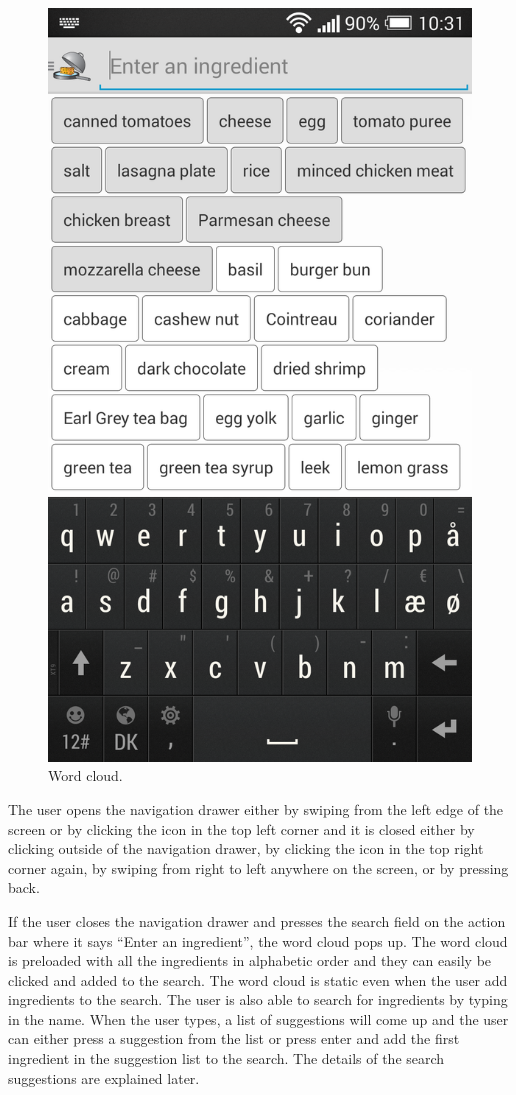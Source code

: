 \begin{figure}[H]
\begin{minipage}[t]{0.5\columnwidth}
\includegraphics[width=0.7\columnwidth]{img/screenshots/finalwordcloud.png}
\caption{Word cloud\label{fig:wordcloud}.}
\end{minipage}
\end{figure}

The user opens the navigation drawer either by swiping from the left edge of the screen or by clicking the icon in the top left corner and it is closed either by clicking outside of the navigation drawer, by clicking the icon in the top right corner again, by swiping from right to left anywhere on the screen, or by pressing back.

If the user closes the navigation drawer and presses the search field on the action bar where it says ``Enter an ingredient'', the word cloud pops up. The word cloud is preloaded with all the ingredients in alphabetic order and they can easily be clicked and added to the search. 
The word cloud is static even when the user add ingredients to the search. 
The user is also able to search for ingredients by typing in the name. 
When the user types, a list of suggestions will come up and the user can either press a suggestion from the list or press enter and add the first ingredient in the suggestion list to the search. 
The details of the search suggestions are explained later.

